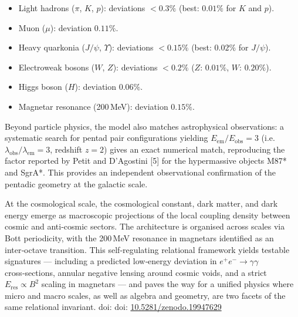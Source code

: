 \documentclass[11pt]{article}
\providecommand{\tightlist}{\setlength{\itemsep}{2pt}\setlength{\parskip}{6pt}}
\providecommand{\tightlist}{%
  \setlength{\itemsep}{2pt}\setlength{\parskip}{6pt}
}
\begin{document}
\begin{center}
\begin{minipage}{0.85\textwidth}
\begin{itemize}
\tightlist
\item
  Light hadrons (\(\pi\), \(K\), \(p\)): deviations \(<0.3\%\) (best:
  \(0.01\%\) for \(K\) and \(p\)).
\item
  Muon (\(\mu\)): deviation \(0.11\%\).
\item
  Heavy quarkonia (\(J/\psi\), \(\Upsilon\)): deviations \(<0.15\%\)
  (best: \(0.02\%\) for \(J/\psi\)).
\item
  Electroweak bosons (\(W\), \(Z\)): deviations \(<0.2\%\) (\(Z\):
  \(0.01\%\), \(W\): \(0.20\%\)).
\item
  Higgs boson (\(H\)): deviation \(0.06\%\).
\item
  Magnetar resonance (200\,MeV): deviation \(0.15\%\).
\end{itemize}

Beyond particle physics, the model also matches astrophysical
observations: a systematic search for pentad pair configurations
yielding \(E_{\text{em}} / E_{\text{obs}} = 3\)
(i.e.~\(\lambda_{\text{obs}} / \lambda_{\text{em}} = 3\), redshift
\(z = 2\)) gives an exact numerical match, reproducing the factor
reported by Petit and D'Agostini {[}5{]} for the hypermassive objects
M87* and SgrA*. This provides an independent observational confirmation
of the pentadic geometry at the galactic scale.

At the cosmological scale, the cosmological constant, dark matter, and
dark energy emerge as macroscopic projections of the local coupling
density between cosmic and anti‑cosmic sectors. The architecture is
organised across scales via Bott periodicity, with the 200\,MeV
resonance in magnetars identified as an inter‑octave transition. This
self‑regulating relational framework yields testable signatures ---
including a predicted low‑energy deviation in \(e^+e^-\to\gamma\gamma\)
cross‑sections, annular negative lensing around cosmic voids, and a
strict \(E_{\text{res}}\propto B^2\) scaling in magnetars --- and paves
the way for a unified physics where micro and macro scales, as well as
algebra and geometry, are two facets of the same relational invariant.
doi: doi:
\href{https://doi.org/10.5281/zenodo.19947629}{10.5281/zenodo.19947629}
\end{minipage}
\end{center}
\vspace{1cm}


\tableofcontents
\clearpage        %
\end{document}
